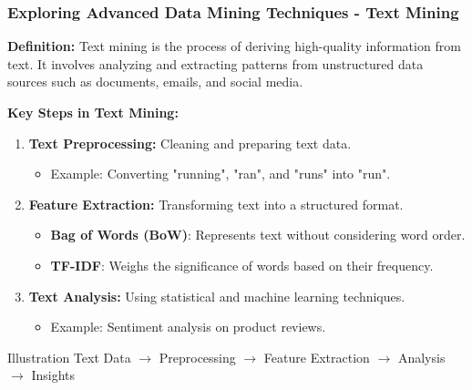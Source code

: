 \documentclass[aspectratio=169]{beamer}
\begin{document}
\begin{frame}[fragile]
    \frametitle{Exploring Advanced Data Mining Techniques - Text Mining}
    \textbf{Definition:} Text mining is the process of deriving high-quality information from text. It involves analyzing and extracting patterns from unstructured data sources such as documents, emails, and social media.
    
    \textbf{Key Steps in Text Mining:}
    \begin{enumerate}
        \item \textbf{Text Preprocessing:} Cleaning and preparing text data.
        \begin{itemize}
            \item Example: Converting "running", "ran", and "runs" into "run".
        \end{itemize}
        
        \item \textbf{Feature Extraction:} Transforming text into a structured format.
        \begin{itemize}
            \item \textbf{Bag of Words (BoW)}: Represents text without considering word order.
            \item \textbf{TF-IDF}: Weighs the significance of words based on their frequency.
        \end{itemize}
        
        \item \textbf{Text Analysis:} Using statistical and machine learning techniques.
        \begin{itemize}
            \item Example: Sentiment analysis on product reviews.
        \end{itemize}
    \end{enumerate}
    
    \begin{block}{Illustration}
        Text Data $\rightarrow$ Preprocessing $\rightarrow$ Feature Extraction $\rightarrow$ Analysis $\rightarrow$ Insights
    \end{block}
\end{frame}
\end{document}
